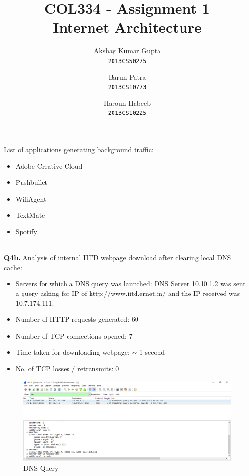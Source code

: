 \documentclass[12pt]{article}
\begin{document}
\title{COL334 - Assignment 1\\ Internet Architecture}
\author{Akshay Kumar Gupta\\\texttt{2013CS50275} \and  Barun Patra\\\texttt{2013CS10773} \and Haroun Habeeb\\\texttt{2013CS10225}}
\date{}
\maketitle
{} List of applications generating background traffic:
\begin{itemize}
\item Adobe Creative Cloud
\item Pushbullet
\item WifiAgent
\item TextMate
\item Spotify
\end{itemize}
~\\
{\bfseries Q4b.} Analysis of internal IITD webpage download after clearing local DNS cache:
\begin{itemize}
\item Servers for which a DNS query was launched: DNS Server 10.10.1.2 was sent a query asking for IP of http://www.iitd.ernet.in/ and the IP received was 10.7.174.111.
\item Number of HTTP requests generated: 60 
\item Number of TCP connections opened: 7
\item Time taken for downloading webpage: $\sim$ 1 second
\item No. of TCP losses / retransmits: 0
\end{itemize}
\begin{figure}[h!]
\includegraphics[scale=0.38]{../Screenshots/dns-reply2.png}
\caption{DNS Query}
\end{figure}
~\\
\end{document}

